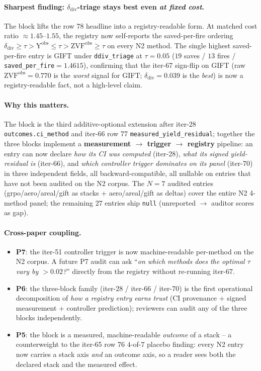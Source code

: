 \documentclass{article}
\begin{document}
\paragraph{Sharpest finding: $\delta_{\mathrm{div}}$-triage stays best even
\emph{at fixed cost}.}
The block lifts the row 78 headline into a registry-readable form. At matched
cost ratio $\approx 1.45$--$1.55$, the registry now self-reports the
saved-per-fire ordering $\delta_{\mathrm{div}}\geq\tau > \mathrm{Y^{obs}}\leq\tau
> \mathrm{ZVF^{obs}}\geq\tau$ on every N2 method. The single highest
saved-per-fire entry is GIFT under \texttt{ddiv\_triage} at $\tau=0.05$
($19$ saves / $13$ fires / \texttt{saved\_per\_fire}$=1.4615$), confirming
that the iter-67 sign-flip on GIFT (raw $\mathrm{ZVF^{obs}}=0.770$ is the
\emph{worst} signal for GIFT; $\delta_{\mathrm{div}}=0.039$ is the
\emph{best}) is now a registry-readable fact, not a high-level claim.

\paragraph{Why this matters.}
The block is the third additive-optional extension after iter-28
\texttt{outcomes.ci\_method} and iter-66 row 77
\texttt{measured\_yield\_residual}; together the three blocks implement a
\textbf{measurement $\to$ trigger $\to$ registry} pipeline: an entry can now
declare \emph{how its CI was computed} (iter-28), \emph{what its signed
yield-residual is} (iter-66), and \emph{which controller trigger dominates on
its panel} (iter-70) in three independent fields, all backward-compatible,
all nullable on entries that have not been audited on the N2 corpus. The
$N{=}7$ audited entries (grpo/aero/areal/gift as stacks + aero/areal/gift as
deltas) cover the entire N2 4-method panel; the remaining $27$ entries ship
\texttt{null} (unreported $\to$ auditor scores as gap).

\paragraph{Cross-paper coupling.}
\begin{itemize}
  \item \textbf{P7}: the iter-51 controller trigger is now machine-readable
        per-method on the N2 corpus. A future P7 audit can ask
        ``\emph{on which methods does the optimal $\tau$ vary by $>0.02$?}''
        directly from the registry without re-running iter-67.
  \item \textbf{P6}: the three-block family (iter-28 / iter-66 / iter-70)
        is the first operational decomposition of \emph{how a registry
        entry earns trust} (CI provenance + signed measurement + controller
        prediction); reviewers can audit any of the three blocks
        independently.
  \item \textbf{P5}: the block is a measured, machine-readable
        \emph{outcome} of a stack -- a counterweight to the iter-65 row 76
        $4$-of-$7$ placebo finding: every N2 entry now carries a stack
        axis \emph{and} an outcome axis, so a reader sees both the declared
        stack and the measured effect.
\end{itemize}
\end{document}
